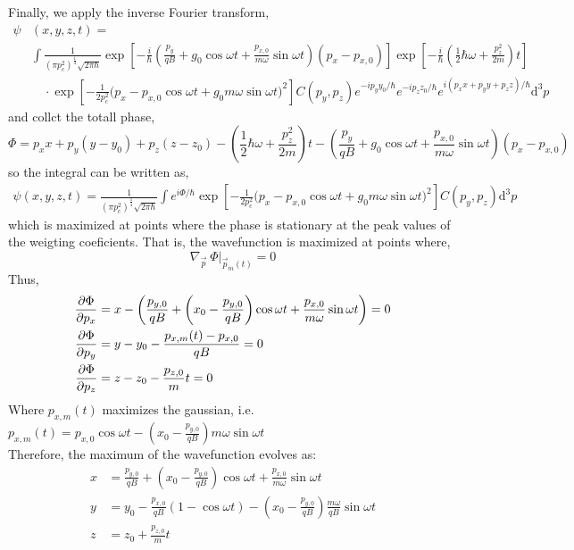 \documentclass[12pt]{extarticle}
\begin{document}
Finally, we apply the inverse Fourier transform, 
\begin{align*}
\psi & (x, y, z, t) =  \\  & \int \frac{1}{\left(\pi p_c^2 \right)^{\frac{1}{4}}\sqrt{2 \pi \hbar}} \exp{\left[-\frac{i}{\hbar} \left(\frac{p_y}{qB} + g_0 \cos{\omega t} + \frac{p_{x, 0}}{m \omega} \sin{\omega t} \right) (p_x - p_{x,0})  \right]} \exp{\left[ -\frac{i}{\hbar} \left(\frac{1}{2} \hbar \omega  + \frac{p_z^2}{2 m} \right) t \right]} \\ & \quad \cdot \exp{\left[ -\frac{1}{2 p_c^2} \Big( p_x - p_{x,0} \cos{\omega t} + g_0 m \omega \sin{\omega t} \Big)^2 \right]}  C(p_y, p_z) e^{-i p_y y_0 /\hbar} e^{-i p_z z_0 /\hbar} e^{i (p_x x + p_y y + p_z z)/\hbar} \mathrm{d}^3 p
\end{align*} 
and collct the totall phase,
\[\Phi = p_x x + p_y (y-y_0) + p_z (z - z_0) - \left(\frac{1}{2} \hbar \omega + \frac{p_z^2}{2m} \right) t - \left( \frac{p_y}{qB} + g_0 \cos{\omega t} + \frac{p_{x, 0}}{m \omega} \sin{\omega t} \right) (p_x - p_{x,0})\] 
so the integral can be written as,
\begin{align*}
\psi (x, y, z, t) = \frac{1}{\left(\pi p_c^2 \right)^{\frac{1}{4}}\sqrt{2 \pi \hbar}} \int  e^{i \Phi / \hbar} \exp{\left[ -\frac{1}{2 p_c^2} \Big( p_x - p_{x,0} \cos{\omega t} + g_0 m \omega \sin{\omega t} \Big)^2 \right]}  C(p_y, p_z)  \mathrm{d}^3 p
\end{align*} 
which is maximized at points where the phase is stationary at the peak values of the weigting coeficients. That is, the wavefunction is maximized at points where,
\[\nabla_{\vec{p}} \: \Phi \Big|_{\vec{p}_m(t)} = 0\]
Thus, 
\begin{align*}
\frac{\partial{\Phi}}{\partial{p_x}} & = x - \left( \frac{p_{y,0}}{qB} + \left(x_0 - \frac{p_{y,0}}{q B} \right) \cos{\omega t} + \frac{p_{x, 0}}{m \omega} \sin{\omega t} \right) = 0 \\
\frac{\partial{\Phi}}{\partial{p_y}} & = y - y_0 - \frac{p_{x,m}(t) - p_{x,0}}{q B} = 0 \\
\frac{\partial{\Phi}}{\partial{p_z}} & = z - z_0 - \frac{p_{z,0}}{m} t = 0
\end{align*}
Where $p_{x,m}(t)$ maximizes the gaussian, i.e. $p_{x,m}(t) = p_{x, 0} \cos{\omega t} - \left(x_0 - \frac{p_{y,0}}{q B} \right) m \omega \sin{\omega t}$ \\
Therefore, the maximum of the wavefunction evolves as:
\begin{align*}
x & =  \frac{p_{y,0}}{qB} + \left(x_0 - \frac{p_{y,0}}{q B} \right) \cos{\omega t} + \frac{p_{x, 0}}{m \omega} \sin{\omega t} \\
y & = y_0 - \frac{p_{x, 0}}{qB}(1 - \cos{\omega t}) - \left(x_0 - \frac{p_{y,0}}{q B} \right) \frac{m \omega}{qB} \sin{\omega t} \\
z & = z_0 + \frac{p_{z,0}}{m} t
\end{align*}
\end{document}
